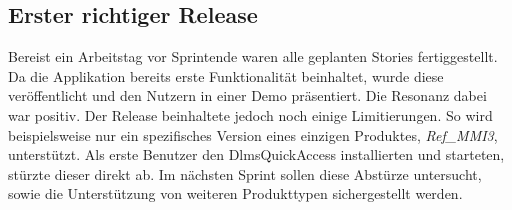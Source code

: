 \subsection{Erster richtiger Release}\label{firstRelease}
Bereist ein Arbeitstag vor Sprintende waren alle geplanten Stories fertiggestellt.
Da die Applikation bereits erste Funktionalität beinhaltet, wurde diese veröffentlicht und den Nutzern in einer Demo präsentiert.
Die Resonanz dabei war positiv.
Der Release beinhaltete jedoch noch einige Limitierungen.
So wird beispielsweise nur ein spezifisches Version eines einzigen Produktes, \textit{Ref\_MMI3}, unterstützt.
Als erste Benutzer den DlmsQuickAccess installierten und starteten, stürzte dieser direkt ab.
Im nächsten Sprint sollen diese Abstürze untersucht, sowie die Unterstützung von weiteren Produkttypen sichergestellt werden.
